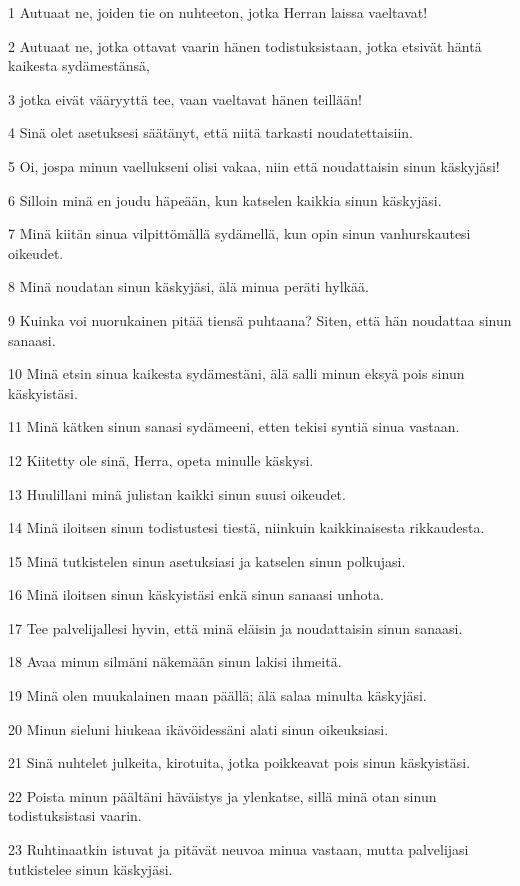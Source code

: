 \par 1 Autuaat ne, joiden tie on nuhteeton, jotka Herran laissa vaeltavat!
\par 2 Autuaat ne, jotka ottavat vaarin hänen todistuksistaan, jotka etsivät häntä kaikesta sydämestänsä,
\par 3 jotka eivät vääryyttä tee, vaan vaeltavat hänen teillään!
\par 4 Sinä olet asetuksesi säätänyt, että niitä tarkasti noudatettaisiin.
\par 5 Oi, jospa minun vaellukseni olisi vakaa, niin että noudattaisin sinun käskyjäsi!
\par 6 Silloin minä en joudu häpeään, kun katselen kaikkia sinun käskyjäsi.
\par 7 Minä kiitän sinua vilpittömällä sydämellä, kun opin sinun vanhurskautesi oikeudet.
\par 8 Minä noudatan sinun käskyjäsi, älä minua peräti hylkää.
\par 9 Kuinka voi nuorukainen pitää tiensä puhtaana? Siten, että hän noudattaa sinun sanaasi.
\par 10 Minä etsin sinua kaikesta sydämestäni, älä salli minun eksyä pois sinun käskyistäsi.
\par 11 Minä kätken sinun sanasi sydämeeni, etten tekisi syntiä sinua vastaan.
\par 12 Kiitetty ole sinä, Herra, opeta minulle käskysi.
\par 13 Huulillani minä julistan kaikki sinun suusi oikeudet.
\par 14 Minä iloitsen sinun todistustesi tiestä, niinkuin kaikkinaisesta rikkaudesta.
\par 15 Minä tutkistelen sinun asetuksiasi ja katselen sinun polkujasi.
\par 16 Minä iloitsen sinun käskyistäsi enkä sinun sanaasi unhota.
\par 17 Tee palvelijallesi hyvin, että minä eläisin ja noudattaisin sinun sanaasi.
\par 18 Avaa minun silmäni näkemään sinun lakisi ihmeitä.
\par 19 Minä olen muukalainen maan päällä; älä salaa minulta käskyjäsi.
\par 20 Minun sieluni hiukeaa ikävöidessäni alati sinun oikeuksiasi.
\par 21 Sinä nuhtelet julkeita, kirotuita, jotka poikkeavat pois sinun käskyistäsi.
\par 22 Poista minun päältäni häväistys ja ylenkatse, sillä minä otan sinun todistuksistasi vaarin.
\par 23 Ruhtinaatkin istuvat ja pitävät neuvoa minua vastaan, mutta palvelijasi tutkistelee sinun käskyjäsi.
